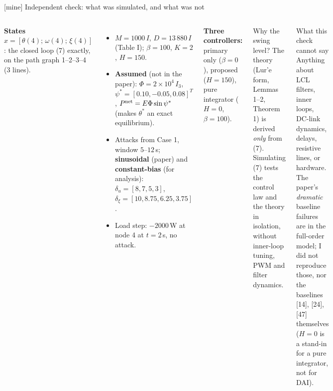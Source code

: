 \documentclass[aspectratio=169,9pt]{beamer}
\begin{document}
\begin{frame}[t]{[mine] Independent check: what was simulated, and what was not}
\footnotesize
\begin{columns}[T]
\textbf{States} $x=[\theta(4);\,\omega(4);\,\xi(4)]$: the closed loop (7) exactly, on the path graph 1--2--3--4 (3 lines).
\begin{itemize}
\item $M=1000\,I$, $D=13\,880\,I$ (Table I); $\beta=100$, $K=2$, $H=150$.
\item \textbf{Assumed} (not in the paper): $\Phi=2\times10^4\,I_3$, $\psi^*=[0.10,-0.05,0.08]^T$, $P^{\rm net}=E\Phi\sin\psi^*$ (makes $\theta^*$ an exact equilibrium).
\item Attacks from Case 1, window $5$--$12$\,s; \textbf{sinusoidal} (paper) and \textbf{constant-bias} (for analysis): $\delta_u=[8,7,5,3]$, $\delta_\xi=[10,8.75,6.25,3.75]$.
\item Load step: $-2000$\,W at node 4 at $t=2$\,s, no attack.
\end{itemize}
\textbf{Three controllers:} primary only ($\beta=0$), proposed ($H=150$), pure integrator ($H=0$, $\beta=100$).
\begin{block}{Why the swing level?}
The theory (Lur'e form, Lemmas 1--2, Theorem 1) is derived \emph{only} from (7). Simulating (7) tests the control law and the theory in isolation, without inner-loop tuning, PWM and filter dynamics.
\end{block}
\begin{alertblock}{What this check cannot say}
Anything about LCL filters, inner loops, DC-link dynamics, delays, resistive lines, or hardware. The paper's \emph{dramatic} baseline failures are in the full-order model; I did not reproduce those, nor the baselines [14], [24], [47] themselves ($H=0$ is a stand-in for a pure integrator, not for DAI).
\end{alertblock}
\end{columns}
\end{frame}
\end{document}
